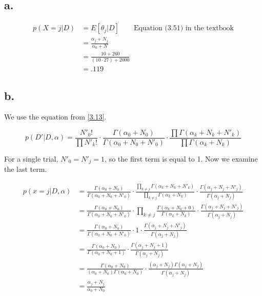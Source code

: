 \documentclass{article}
\begin{document}
\subsection{a.}

\begin{align*}
  p(X=j|D) &= E[\theta_j|D] \qquad \text{Equation (3.51) in the
  textbook} \\
           &= \frac{\alpha_j + N_j}{\alpha_0 + N} \\
           &= \frac{10 + 260}{(10 \cdot 27) + 2000} \\
           &= .119
\end{align*}

\subsection{b.}

We use the equation from \ref{3.13}.

\begin{equation*}
  p(D'|D,\alpha) = \frac{N'_0!}{\prod N'_k!} \cdot \frac{\Gamma(\alpha_0 +
                   N_0)}{\Gamma(\alpha_0 + N_0 + N'_0)} \cdot
                   \frac{\prod \Gamma(\alpha_k + N_k + N'_k)}{\prod
                   \Gamma(\alpha_k + N_k)}
\end{equation*}

For a single trial, $ N'_0 = N'_j= 1$, so the first term is equal to
1. Now we examine the last term.

\begin{align*}
  p(x=j|D,\alpha) &= \frac{\Gamma(\alpha_0 + N_0)}{\Gamma(\alpha_0 + N_0 + N'_0)}
             \cdot \frac{\prod_{k \neq j} \Gamma(\alpha_k + N_k +
             N'_k)}{\prod_{k \neq j} \Gamma(\alpha_k + N_k)} \cdot
             \frac{\Gamma(\alpha_j + N_j + N'_j)}{\Gamma(\alpha_j +
             N_j)} \\
           &= \frac{\Gamma(\alpha_0 + N_0)}{\Gamma(\alpha_0 + N_0 + N'_0)}
             \cdot \prod_{k \neq j} \frac{\Gamma(\alpha_k + N_k +
             0)}{\Gamma(\alpha_k + N_k)} \cdot \frac{\Gamma(\alpha_j +
             N_j + N'_j)}{\Gamma(\alpha_j + N_j)} \\
           &= \frac{\Gamma(\alpha_0 + N_0)}{\Gamma(\alpha_0 + N_0 + N'_0)}
             \cdot 1 \cdot \frac{\Gamma(\alpha_j +
             N_j + N'_j)}{\Gamma(\alpha_j + N_j)} \\
           &= \frac{\Gamma(\alpha_0 + N_0)}{\Gamma(\alpha_0 + N_0 + 1)}
             \cdot \frac{\Gamma(\alpha_j +
             N_j + 1)}{\Gamma(\alpha_j + N_j)} \\
           &= \frac{\Gamma(\alpha_0 + N_0)}{(\alpha_0 +
             N_0)\Gamma(\alpha_0 + N_0)} \cdot \frac{(\alpha_j +
             N_j)\Gamma(\alpha_j + N_j)}{\Gamma(\alpha_j + N_j)} \\
           &= \frac{\alpha_j + N_j}{\alpha_0 + N_0}
\end{align*}
\end{document}
